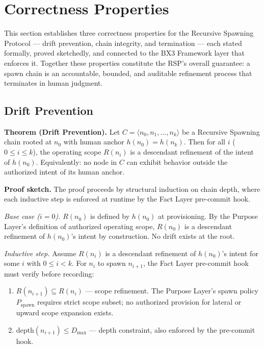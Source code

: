 \section{Correctness Properties}
\label{sec:rs-correctness}

This section establishes three correctness properties for the Recursive Spawning Protocol — drift prevention, chain integrity, and termination — each stated formally, proved sketchedly, and connected to the BX3 Framework layer that enforces it. Together these properties constitute the RSP's overall guarantee: a spawn chain is an accountable, bounded, and auditable refinement process that terminates in human judgment.

\subsection{Drift Prevention}
\label{sec:rs-drift-prevention}

\noindent\textbf{Theorem (Drift Prevention).} Let $C = \langle n_0, n_1, \ldots, n_k \rangle$ be a Recursive Spawning chain rooted at $n_0$ with human anchor $h(n_0) = h(n_k)$. Then for all $i$ ($0 \leq i \leq k$), the operating scope $R(n_i)$ is a descendant refinement of the intent of $h(n_0)$. Equivalently: no node in $C$ can exhibit behavior outside the authorized intent of its human anchor.

\medskip
\noindent\textbf{Proof sketch.} The proof proceeds by structural induction on chain depth, where each inductive step is enforced at runtime by the Fact Layer pre-commit hook.

\medskip
\textit{Base case ($i=0$).} $R(n_0)$ is defined by $h(n_0)$ at provisioning. By the Purpose Layer's definition of authorized operating scope, $R(n_0)$ is a descendant refinement of $h(n_0)$'s intent by construction. No drift exists at the root.

\medskip
\textit{Inductive step.} Assume $R(n_i)$ is a descendant refinement of $h(n_0)$'s intent for some $i$ with $0 \leq i < k$. For $n_i$ to spawn $n_{i+1}$, the Fact Layer pre-commit hook must verify before recording:

\begin{enumerate}
    \item[(a)] $R(n_{i+1}) \subseteq R(n_i)$ — scope refinement. The Purpose Layer's spawn policy $P_{\mathrm{spawn}}$ requires strict scope subset; no authorized provision for lateral or upward scope expansion exists.
    \item[(b)] $\mathrm{depth}(n_{i+1}) \leq D_{\mathrm{max}}$ — depth constraint, also enforced by the pre-commit hook.
\end{enumerate}


